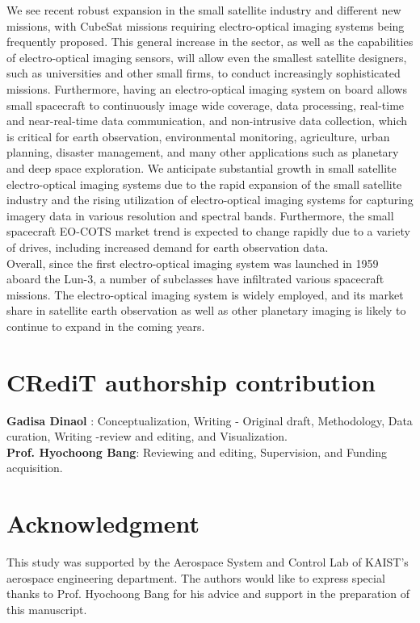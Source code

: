 \documentclass[final,5p,times,twocolumn,authoryear]{elsarticle}
\begin{document}
We see recent robust expansion in the small satellite industry and different new missions, with CubeSat missions requiring electro-optical imaging systems being frequently proposed. This general increase in the sector, as well as the capabilities of electro-optical imaging sensors, will allow even the smallest satellite designers, such as universities and other small firms, to conduct increasingly sophisticated missions. Furthermore, having an electro-optical imaging system on board allows small spacecraft to continuously image wide coverage, data processing, real-time and near-real-time data communication, and non-intrusive data collection, which is critical for earth observation, environmental monitoring, agriculture, urban planning, disaster management, and many other applications such as planetary and deep space exploration.  We anticipate substantial growth in small satellite electro-optical imaging systems due to the rapid expansion of the small satellite industry and the rising utilization of electro-optical imaging systems for capturing imagery data in various resolution and spectral bands. Furthermore, the small spacecraft EO-COTS market trend is expected to change rapidly due to a variety of drives, including increased demand for earth observation data.\\
Overall, since the first electro-optical imaging system was launched in 1959 aboard the Lun-3, a number of subclasses have infiltrated various spacecraft missions. The electro-optical imaging system is widely employed, and its market share in satellite earth observation as well as other planetary imaging is likely to continue to expand in the coming years.
\section*{CRediT authorship contribution }
\textbf{Gadisa Dinaol }: Conceptualization,  Writing - Original draft, Methodology, Data curation, Writing -review and editing, and Visualization.\\
\textbf{Prof. Hyochoong Bang}: Reviewing and editing,  Supervision, and Funding acquisition.
\section*{Acknowledgment}
This study was supported by the Aerospace System and Control Lab of KAIST's aerospace engineering department. The authors would like to express special thanks to Prof. Hyochoong Bang for his advice and support in the preparation of this manuscript.
\end{document}
